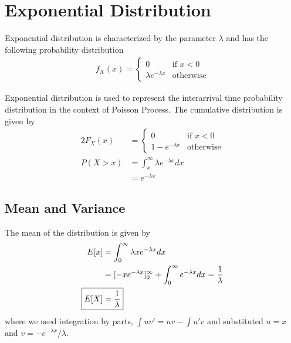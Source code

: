 \documentclass[../../probability-notes.tex]{subfiles}
\begin{document}
    \section{Exponential Distribution}
    Exponential distribution is characterized by the parameter $\lambda$ and has the following probability distribution
    \begin{align*}
        f_{X}(x) = \begin{cases} 0 &\mbox{if $x < 0$}\\
                                \lambda e^{-\lambda x} &\mbox{otherwise} \end{cases}
    \end{align*}

    Exponential distribution is used to represent the interarrival time probability distribution in the context of Poisson Process. The cumulative distribution is given by
    \begin{alignat*}{2}
        F_{X}(x) &= \begin{cases} 0 &\mbox{if $x < 0$}\\
                                1 - e^{-\lambda x} &\mbox{otherwise} \end{cases}\\
        P(X > x) &= \int_{x}^{\infty} \lambda e^{-\lambda x} dx\\
        &= e^{-\lambda x}
    \end{alignat*}

    \subsection{Mean and Variance}
    The mean of the distribution is given by
    \begin{align*}
        E[x] &= \int_{0}^{\infty} \lambda x e^{-\lambda x} dx\\
        &= [-x e^{-\lambda x}]_{0}^{\infty} + \int_{0}^{\infty} e^{-\lambda x} dx = \frac{1}{\lambda}\\
        \Aboxed{E[X] &= \frac{1}{\lambda}}
    \end{align*}
    where we used integration by parts, $\int uv' = uv - \int u'v$ and substituted $u = x$ and $v = -e^{-\lambda x}/\lambda$.\newline
\end{document}
